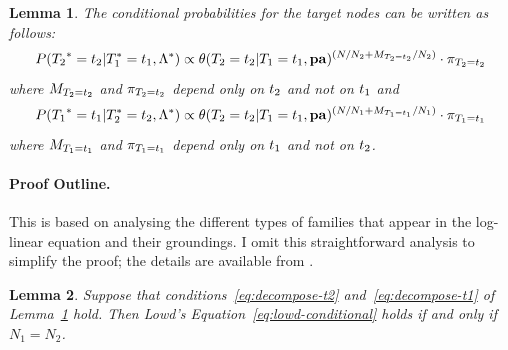 \documentclass{sfuthesis}
\renewcommand{\marginpar}[1]{\fixneeded{(AS MARGINPAR) #1}}
\newcommand{\fixneeded}[1]{\textbf{[\footnotesize #1]}}
\newtheorem{lemma}{Lemma}
\begin{document}
\begin{appendices}
\begin{lemma} \label{lemma:decompose-cond} The conditional probabilities for the target nodes can be written as follows:
\begin{equation}
P({T_{2}}^{*}\hspace{0.0ex} = t_{2} | T_{1}^{*}\hspace{0.0ex} = t_{1},\Lambda^{*}\hspace{0.0ex}) \propto \theta(T_{2} = t_{2}|T_{1} = t_{1},\mathbf{pa})^{(N/N_{2}+M_{T_2=t_{2}}/N_{2})} \cdot \pi_{T_2=t_{2}} \label{eq:decompose-t2}
\end{equation}
where $M_{T_2=t_{2}}$ and $\pi_{T_2=t_{2}}$ depend only on $t_{2}$ and not on $t_{1}$ and
\begin{equation}
P({T_{1}}^{*}\hspace{0.0ex} = t_{1} | T_{2}^{*}\hspace{0.0ex} = t_{2},\Lambda^{*}\hspace{0.0ex}) \propto \theta(T_{2} = t_{2}|T_{1} = t_{1},\mathbf{pa})^{(N/N_{1}+M_{T_1=t_{1}}/N_{1})} \cdot \pi_{T_1=t_{1}} \label{eq:decompose-t1}
\end{equation} 
where $M_{T_1=t_{1}}$ and $\pi_{T_1=t_{1}}$ depend only on $t_{1}$ and not on $t_{2}$.
\end{lemma}

\paragraph{Proof Outline.} This is based on analysing the different types of families that appear in the log-linear equation and their groundings. I  omit this straightforward analysis to simplify the proof; the details are available from \cite{Schulte2014a}.



\begin{lemma} \label{lemma:family-agree}
Suppose that conditions~\eqref{eq:decompose-t2} and~\eqref{eq:decompose-t1} of Lemma~\ref{lemma:decompose-cond} hold. Then Lowd's Equation~\eqref{eq:lowd-conditional} holds if and only if $N_{1} = N_{2}$. 
\end{lemma}


\end{appendices}
\end{document}
